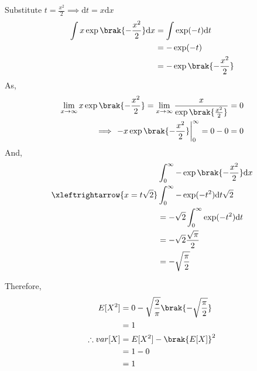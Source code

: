 \documentclass[journal,12pt,twocolumn]{IEEEtran}
\renewcommand\thesection{\arabic{section}}
\begin{document}
\begin{enumerate}[label=\thesection.\arabic*
,ref=\thesection.\theenumi]
	Substitute $t = \frac{x^2}{2} \implies \mathrm{d}t = x\mathrm{d}x$
	\begin{align}
		\int x \exp\brak{-\frac{x^2}{2}} \mathrm{d}x &= \int \exp(-t) \mathrm{d}t \\
		&= - \exp(-t) \\
		&= - \exp\brak{-\frac{x^2}{2}}
	\end{align}
	As,
	\begin{align}
		 \lim_{x\to\infty} x \exp\brak{-\frac{x^2}{2}} = \lim_{x\to\infty} \frac{x}{\exp\brak{\frac{x^2}{2}}} =0\\
		 \implies \left. -x \exp\brak{-\frac{x^2}{2}} \right|_0^{\infty} = 0 - 0 = 0 \\
	\end{align}
	And, 
	\begin{align}
		&\int_0^{\infty} - \exp\brak{-\frac{x^2}{2}} \mathrm{d}x \\
		\xleftrightarrow{x = t\sqrt{2}} &\int_0^{\infty} -\exp(-t^2) \mathrm{d}t\sqrt{2} \\
		&= -{\sqrt{2}} \int_0^{\infty} \exp(-t^2) \mathrm{d}t \\
		&= -{\sqrt{2}} \frac{\sqrt{\pi}}{2} \\
		&= - \sqrt{\frac{\pi}{2}}
	\end{align}
	
	Therefore,
	\begin{align}
		E[X^2] &= 0 - \sqrt{\frac{2}{\pi}} \brak{- \sqrt{\frac{\pi}{2}}} \\
		&= 1 \\
		\therefore var[X] &= E[X^2] - \brak{E[X]}^2 \\
		&= 1 - 0 \\
				&= 1
	\end{align}
%
\end{enumerate}
\end{document}
